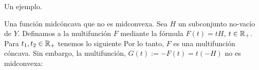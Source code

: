 \begin{frame}{Un ejemplo.}
  \begin{exampleblock}{Una función midcóncava que no es midconvexa.}
    Sea $H$ un subconjunto no-vac\'io de $Y$. Definamos a la multifunci\'on $F$ mediante 
    la f\'ormula $F(t) = tH$, $t\in \mathbb{R}_+$. Para $t_1,t_2\in\mathbb{R}_+$ tenemos lo siguiente
    Por lo tanto, $F$ es una multifunci\'on c\'oncava. Sin embargo, la multifunción, 
    $G(t):=-F(t) = t(-H)$ no es midconvexa:
  \end{exampleblock}
\end{frame}